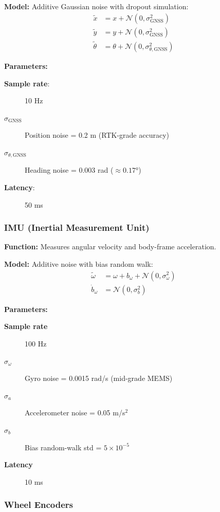 \documentclass[12pt]{article}
\begin{document}
\textbf{Model:} Additive Gaussian noise with dropout simulation:
\begin{align}
\tilde{x} &= x + \mathcal{N}(0, \sigma_{\text{GNSS}}^2) \\
\tilde{y} &= y + \mathcal{N}(0, \sigma_{\text{GNSS}}^2) \\
\tilde{\theta} &= \theta + \mathcal{N}(0, \sigma_{\theta,\text{GNSS}}^2)
\end{align}

	\textbf{Parameters:}
\begin{description}
    \item[\textbf{Sample rate}:] 10 Hz
    \item[\textbf{$\sigma_{\text{GNSS}}$}] Position noise = 0.2 m (RTK-grade accuracy)
    \item[\textbf{$\sigma_{\theta,\text{GNSS}}$}] Heading noise = 0.003 rad ($\approx0.17°$)
    \item[\textbf{Latency}:] 50 ms
\end{description}

\subsubsection{IMU (Inertial Measurement Unit)}

\textbf{Function:} Measures angular velocity and body-frame acceleration.

\textbf{Model:} Additive noise with bias random walk:
\begin{align}
\tilde{\omega} &= \omega + b_{\omega} + \mathcal{N}(0, \sigma_{\omega}^2) \\
\dot{b}_{\omega} &= \mathcal{N}(0, \sigma_{b}^2)
\end{align}

	\textbf{Parameters:}
\begin{description}
    \item[\textbf{Sample rate}] 100 Hz
    \item[\textbf{$\sigma_{\omega}$}] Gyro noise = 0.0015 rad/s (mid-grade MEMS)
    \item[\textbf{$\sigma_{a}$}] Accelerometer noise = 0.05 m/s$^2$
    \item[\textbf{$\sigma_{b}$}] Bias random-walk std = $5\times 10^{-5}$
    \item[\textbf{Latency}] 10 ms
\end{description}

\subsubsection{Wheel Encoders}
\end{document}
